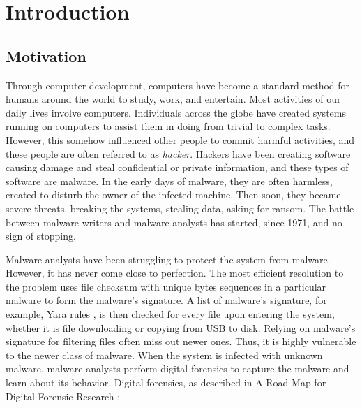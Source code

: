 \chapter[Introduction]{Introduction}

\section[Motivation]{Motivation}

Through computer development, computers have become a standard method for
humans around the world to study, work, and entertain. Most activities of our
daily lives involve computers. Individuals across the globe have created
systems running on computers to assist them in doing from trivial to complex
tasks. However, this somehow influenced other people to commit harmful
activities, and these people are often referred to as \textit{hacker}.  Hackers
have been creating software causing damage and steal confidential or private
information, and these types of software are malware. In the early days of
malware, they are often harmless, created to disturb the owner of the infected
machine.  Then soon, they became severe threats, breaking the systems, stealing
data, asking for ransom. The battle between malware writers and malware
analysts has started, since 1971, and no sign of stopping.

Malware analysts have been struggling to protect the system from malware.
However, it has never come close to perfection. The most efficient resolution
to the problem uses file checksum with unique bytes sequences in a particular
malware to form the malware's signature. A list of malware's signature, for
example, Yara rules \cite{yararules}, is then checked for every file upon
entering the system, whether it is file downloading or copying from USB to
disk. Relying on malware's signature for filtering files often miss out newer
ones. Thus, it is highly vulnerable to the newer class of malware. When the
system is infected with unknown malware, malware analysts perform digital
forensics to capture the malware and learn about its behavior. Digital
forensics, as described in A Road Map for Digital Forensic Research
\cite{roadmap}:



